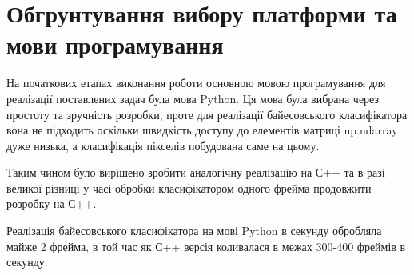 \section{Обгрунтування вибору платформи та мови програмування}

На початкових етапах виконання роботи основною мовою програмування для реалізації поставлених задач була мова Python. Ця мова була вибрана через простоту та зручність розробки, проте для реалізації байесовського класифікатора вона не підходить оскільки швидкість доступу до елементів матриці np.ndarray дуже низька, а класифікація пікселів побудована саме на цьому.

Таким чином було вирішено зробити аналогічну реалізацію на С++ та в разі великої різниці у часі обробки класифікатором одного фрейма продовжити розробку на С++. 

Реалізація байесовського класифікатора на мові Python в секунду обробляла майже 2 фрейма, в той час як С++ версія коливалася в межах 300-400 фреймів в секунду.